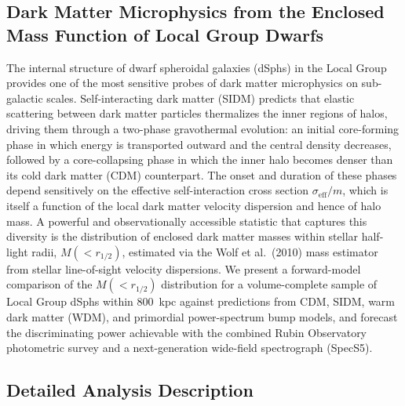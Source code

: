 

\subsection*{Dark Matter Microphysics from the Enclosed Mass Function of Local Group Dwarfs}

The internal structure of dwarf spheroidal galaxies (dSphs) in the Local Group provides
one of the most sensitive probes of dark matter microphysics on sub-galactic scales.
Self-interacting dark matter (SIDM) predicts that elastic scattering between dark matter
particles thermalizes the inner regions of halos, driving them through a two-phase
gravothermal evolution: an initial core-forming phase in which energy is transported
outward and the central density decreases, followed by a core-collapsing phase in which
the inner halo becomes denser than its cold dark matter (CDM) counterpart.
The onset and duration of these phases depend sensitively on the effective
self-interaction cross section $\sigma_\mathrm{eff}/m$, which is itself a function of the
local dark matter velocity dispersion and hence of halo mass.
A powerful and observationally accessible statistic that captures this diversity is the
distribution of enclosed dark matter masses within stellar half-light radii,
$M(<r_{1/2})$, estimated via the Wolf et al.\ (2010) mass estimator from stellar
line-of-sight velocity dispersions.
We present a forward-model comparison of the $M(<r_{1/2})$ distribution for a
volume-complete sample of Local Group dSphs within 800~kpc against predictions from CDM,
SIDM, warm dark matter (WDM), and primordial power-spectrum bump models, and forecast
the discriminating power achievable with the combined Rubin Observatory photometric
survey and a next-generation wide-field spectrograph (SpecS5).



\subsection*{Detailed Analysis Description}

